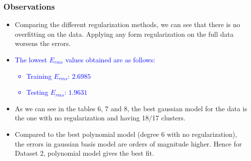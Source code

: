 \documentclass[12pt,a4paper]{article}
\begin{document}
\subsubsection{Observations}
\begin{itemize}
    \item Comparing the different regularization methods, we can see that there is no overfitting on the data. Applying any form regularization on the full data worsens the errors.
    \item \textcolor{blue}{The lowest $E_{rms}$ values obtained are as follows:
    \begin{itemize}
        \itemsep0em
        \item Training $E_{rms}$: $2.6985$
        \item Testing $E_{rms}$: $1.9631$
    \end{itemize}
    }
    \item As we can see in the tables 6, 7 and 8, the best gaussian model for the data is the one with no regularization and having 18/17 clusters.
    \item Compared to the best polynomial model (degree 6 with no regularization), the errors in gaussian basis model are orders of magnitude higher. Hence for Dataset 2, polynomial model gives the best fit.
\end{itemize}
\end{document}
